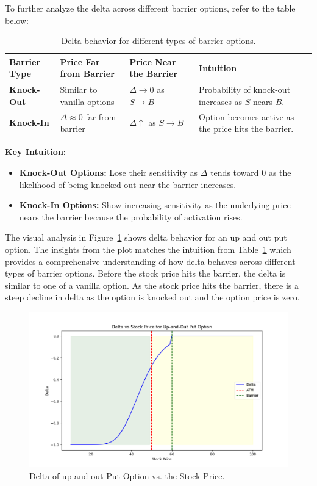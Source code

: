 To further analyze the delta across different barrier options, refer to the table below:
\begin{center}
	\begin{table}[H]
		\begin{tabular}{ | m{3cm} | m{5cm}| m{4cm} | m{4cm}|} 
			\hline
			\textbf{Barrier Type} & \textbf{Price Far from Barrier} & \textbf{Price Near the Barrier} & \textbf{Intuition}  \\
			\hline
			\textbf{Knock-Out} & Similar to vanilla options     & $\Delta \to 0$ as $S \to B$  & Probability of knock-out increases as $S$ nears $B$. \\ 
			\hline
			\textbf{Knock-In}  & $\Delta \approx 0$ far from barrier   & $\Delta \uparrow$ as $S \to B$  & Option becomes active as the price hits the barrier. \\ 
			\hline
		\end{tabular}
		\caption{Delta behavior for different types of barrier options.}
		\label{tab:delta_barrier_options}
	\end{table}
\end{center}
\textbf{Key Intuition:}
\begin{itemize}
    \item \textbf{Knock-Out Options:} Lose their sensitivity as $\Delta$ tends toward $0$ as the likelihood of being knocked out near the barrier increases.
    \item \textbf{Knock-In Options:} Show increasing sensitivity as the underlying price nears the barrier because the probability of activation rises.
\end{itemize}

The visual analysis in Figure~\ref{fig:delta_upout} shows delta behavior for an up and out put option. The insights from the plot matches the intuition from Table~\ref{tab:delta_barrier_options} which provides a comprehensive understanding of how delta behaves across different types of barrier options. Before the stock price hits the barrier, the delta is similar to one of a vanilla option. As the stock price hits the barrier, there is a steep decline in delta as the option is knocked out and the option price is zero.
\begin{figure}[H]
    \centering
    \includegraphics[width=.65\linewidth]{content/images/delta.png}
    \caption{Delta of up-and-out Put Option vs. the Stock Price.}
    \label{fig:delta_upout}
\end{figure}

